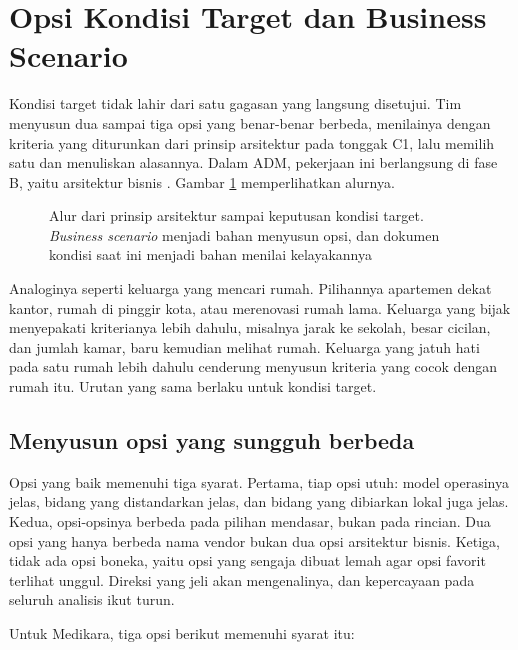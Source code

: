 \section{Opsi Kondisi Target dan Business Scenario}

Kondisi target tidak lahir dari satu gagasan yang langsung disetujui. Tim menyusun dua
sampai tiga opsi yang benar-benar berbeda, menilainya dengan kriteria yang diturunkan dari
prinsip arsitektur pada tonggak C1, lalu memilih satu dan menuliskan alasannya. Dalam ADM,
pekerjaan ini berlangsung di fase B, yaitu arsitektur bisnis \cite{togaf10}. Gambar
\ref{fig:ch08-alur-opsi} memperlihatkan alurnya.

\begin{figure}[!htb]
  \centering
  
  \caption{Alur dari prinsip arsitektur sampai keputusan kondisi target. \textit{Business
           scenario} menjadi bahan menyusun opsi, dan dokumen kondisi saat ini menjadi bahan
           menilai kelayakannya}
  \label{fig:ch08-alur-opsi}
\end{figure}

Analoginya seperti keluarga yang mencari rumah. Pilihannya apartemen dekat kantor, rumah di
pinggir kota, atau merenovasi rumah lama. Keluarga yang bijak menyepakati kriterianya lebih
dahulu, misalnya jarak ke sekolah, besar cicilan, dan jumlah kamar, baru kemudian melihat
rumah. Keluarga yang jatuh hati pada satu rumah lebih dahulu cenderung menyusun kriteria
yang cocok dengan rumah itu. Urutan yang sama berlaku untuk kondisi target.

\subsection*{Menyusun opsi yang sungguh berbeda}

Opsi yang baik memenuhi tiga syarat. Pertama, tiap opsi utuh: model operasinya jelas,
bidang yang distandarkan jelas, dan bidang yang dibiarkan lokal juga jelas. Kedua,
opsi-opsinya berbeda pada pilihan mendasar, bukan pada rincian. Dua opsi yang hanya berbeda
nama vendor bukan dua opsi arsitektur bisnis. Ketiga, tidak ada opsi boneka, yaitu opsi
yang sengaja dibuat lemah agar opsi favorit terlihat unggul. Direksi yang jeli akan
mengenalinya, dan kepercayaan pada seluruh analisis ikut turun.

Untuk Medikara, tiga opsi berikut memenuhi syarat itu:

